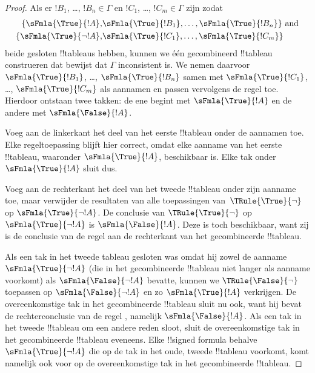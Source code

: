 \documentclass[../../../include/open-logic-section]{subfiles}
\begin{document}
\begin{proof}
  Als er $!B_1$, \dots, $!B_n \in \Gamma$ en $!C_1$, \dots,
  $!C_m \in \Gamma$ zijn zodat
  \begin{align*}
    \{\sFmla{\True}{!A}, &
    \sFmla{\True}{!B_1}, \dots, \sFmla{\True}{!B_n}\} \text{ and}\\
    \{\sFmla{\True}{\lnot !A}, &
    \sFmla{\True}{!C_1}, \dots, \sFmla{\True}{!C_m}\}
  \end{align*}
  beide gesloten !!{tableau}s hebben, kunnen we één gecombineerd
  !!{tableau} construeren dat bewijst dat $\Gamma$ inconsistent is.
  We nemen daarvoor $\sFmla{\True}{!B_1}$, \dots,
  $\sFmla{\True}{!B_n}$ samen met $\sFmla{\True}{!C_1}$, \dots,
  $\sFmla{\True}{!C_m}$ als aannamen en passen vervolgens de regel
  \Cut{} toe. Hierdoor ontstaan twee takken: de ene begint met
  $\sFmla{\True}{!A}$ en de andere met $\sFmla{\False}{!A}$.  
  
  Voeg aan de linkerkant het deel van het eerste !!{tableau} onder de
  aannamen toe. Elke regeltoepassing blijft hier correct, omdat elke
  aanname van het eerste !!{tableau}, waaronder
  $\sFmla{\True}{!A}$, beschikbaar is. Elke tak onder
  $\sFmla{\True}{!A}$ sluit dus. 
  
  Voeg aan de rechterkant het deel van het tweede !!{tableau} onder
  zijn aanname toe, maar verwijder de resultaten van alle toepassingen
  van~$\TRule{\True}{\lnot}$ op $\sFmla{\True}{\lnot !A}$. De conclusie
  van $\TRule{\True}{\lnot}$ op $\sFmla{\True}{\lnot !A}$ is
  $\sFmla{\False}{!A}$. Deze is toch beschikbaar, want zij is de
  conclusie van de regel \Cut{} aan de rechterkant van het
  gecombineerde !!{tableau}.

  Als een tak in het tweede tableau gesloten was omdat hij zowel de
  aanname $\sFmla{\True}{\lnot !A}$ (die in het gecombineerde
  !!{tableau} niet langer als aanname voorkomt) als
  $\sFmla{\False}{\lnot !A}$ bevatte, kunnen we
  $\TRule{\False}{\lnot}$ toepassen op
  $\sFmla{\False}{\lnot !A}$ en zo $\sFmla{\True}{!A}$ verkrijgen. De
  overeenkomstige tak in het gecombineerde !!{tableau} sluit nu ook,
  want hij bevat de rechterconclusie van de regel \Cut{}, namelijk
  $\sFmla{\False}{!A}$. Als een tak in het tweede !!{tableau} om een
  andere reden sloot, sluit de overeenkomstige tak in het gecombineerde
  !!{tableau} eveneens. Elke !!{signed formula} behalve
  $\sFmla{\True}{\lnot !A}$ die op de tak in het oude, tweede
  !!{tableau} voorkomt, komt namelijk ook voor op de overeenkomstige tak
  in het gecombineerde !!{tableau}.
  \end{proof}
\end{document}
